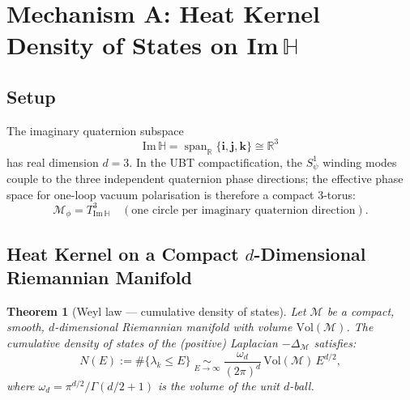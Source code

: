 \documentclass[12pt,a4paper]{article}
\newtheorem{theorem}{Theorem}[section]
\theoremstyle{definition}
\theoremstyle{remark}
\begin{document}
\section{Mechanism A: Heat Kernel Density of States on Im\,$\mathbb{H}$}
\label{sec:exp32:heatkernel}

\subsection{Setup}
\label{ssec:exp32:hk:setup}

The imaginary quaternion subspace
\begin{equation}
  \mathrm{Im}\,\mathbb{H} = \operatorname{span}_\mathbb{R}\{\mathbf{i}, \mathbf{j}, \mathbf{k}\}
  \cong \mathbb{R}^3
  \label{eq:exp32:ImH}
\end{equation}
has real dimension $d = 3$.  In the UBT compactification, the $S^1_\psi$ winding
modes couple to the three independent quaternion phase directions; the effective
phase space for one-loop vacuum polarisation is therefore a compact 3-torus:
\begin{equation}
  \mathcal{M}_\phi = T^3_{\mathrm{Im}\,\mathbb{H}}
  \quad (\text{one circle per imaginary quaternion direction}).
  \label{eq:exp32:T3}
\end{equation}

\subsection{Heat Kernel on a Compact $d$-Dimensional Riemannian Manifold}
\label{ssec:exp32:hk:formula}

\begin{theorem}[Weyl law — cumulative density of states]
\label{thm:exp32:weyl}
Let $\mathcal{M}$ be a compact, smooth, $d$-dimensional Riemannian manifold
with volume $\mathrm{Vol}(\mathcal{M})$.  The cumulative density of states of
the (positive) Laplacian $-\Delta_\mathcal{M}$ satisfies:
\begin{equation}
  N(E) := \#\{\lambda_k \leq E\}
  \;\underset{E\to\infty}{\sim}\;
  \frac{\omega_d}{(2\pi)^d}\,\mathrm{Vol}(\mathcal{M})\, E^{d/2},
  \label{eq:exp32:weyl}
\end{equation}
where $\omega_d = \pi^{d/2}/\Gamma(d/2+1)$ is the volume of the unit $d$-ball.
\end{theorem}
\end{document}
